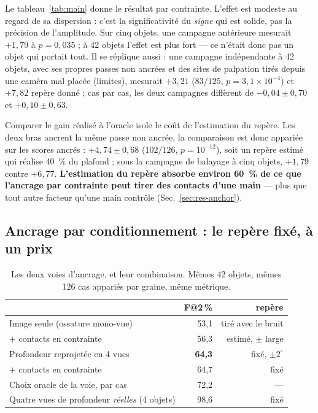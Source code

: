 \documentclass[conference]{IEEEtran}
\makeatletter
\newcommand{\gd}[1]{\textbf{#1}}
\newcommand{\Fs}{F@2\,\%}
\makeatother
\begin{document}
Le tableau~\ref{tab:main} donne le résultat par contrainte. L'effet est modeste au
regard de sa dispersion : c'est la significativité du \emph{signe} qui est solide, pas
la précision de l'amplitude. Sur cinq objets, une campagne antérieure mesurait
$+1{,}79$ à $p = 0{,}035$ ; à 42 objets l'effet est plus fort --- ce n'était donc pas
un objet qui portait tout. Il se réplique aussi : une campagne indépendante à 42
objets, avec ses propres passes non ancrées et des sites de palpation tirés depuis une
caméra mal placée (limites), mesurait $+3{,}21$ ($83/125$, $p = 3{,}1\times10^{-4}$) et
$+7{,}82$ repère donné ; cas par cas, les deux campagnes diffèrent de $-0{,}04 \pm
0{,}70$ et $+0{,}10 \pm 0{,}63$.

Comparer le gain réalisé à l'oracle isole le coût de l'estimation du repère. Les deux
bras ancrent la même passe non ancrée, la comparaison est donc appariée sur les scores
ancrés : $+4{,}74 \pm 0{,}68$ ($102/126$, $p = 10^{-12}$), soit un repère estimé qui
réalise $40$~\% du plafond ; sous la campagne de balayage à cinq objets, $+1{,}79$
contre $+6{,}77$. \textbf{L'estimation du repère absorbe environ 60~\% de ce que
l'ancrage par contrainte peut tirer des contacts d'une main} --- plus que tout autre
facteur qu'une main contrôle (Sec.~\ref{sec:res-anchor}).

\subsection{Ancrage par conditionnement : le repère fixé, à un prix}
\label{sec:res-conditioning}

\begin{table}[t]
\centering
\caption{Les deux voies d'ancrage, et leur combinaison. Mêmes 42 objets, mêmes 126
cas appariés par graine, même métrique.}
\label{tab:routes}
\begin{tabular}{lrr}
\toprule
& \Fs & repère \\
\midrule
Image seule (ossature mono-vue) & 53,1 & tiré avec le bruit \\
\quad $+$ contacts en contrainte & 56,3 & estimé, $\pm$ large \\
Profondeur reprojetée en 4 vues & \gd{64,3} & fixé, $\pm 2^\circ$ \\
\quad $+$ contacts en contrainte & 64,7 & fixé \\
\midrule
Choix oracle de la voie, par cas & 72,2 & --- \\
Quatre vues de profondeur \emph{réelles} (4 objets) & 98,6 & fixé \\
\bottomrule
\end{tabular}
\end{table}
\end{document}

